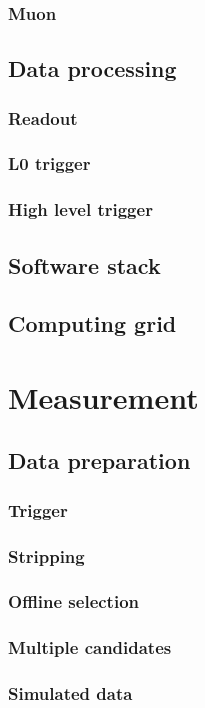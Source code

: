 \subsection{Muon}
\section{Data processing}
\subsection{Readout}
\subsection{L0 trigger}
\subsection{High level trigger}
\section{Software stack}
\section{Computing grid}

\chapter{Measurement}
\section{Data preparation}
\subsection{Trigger}
\subsection{Stripping}
\subsection{Offline selection}
\subsection{Multiple candidates}
\subsection{Simulated data}
